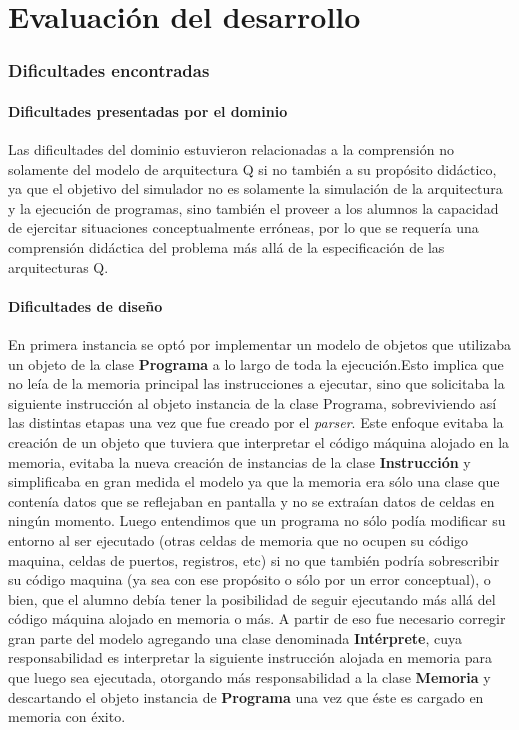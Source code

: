\part{Evaluación del desarrollo}

\section{Dificultades encontradas}

\subsection{Dificultades presentadas por el dominio}
Las dificultades del dominio estuvieron relacionadas a la comprensión no solamente del modelo de arquitectura Q si no también a su propósito didáctico, ya que el objetivo del simulador no es solamente la simulación de la arquitectura y la ejecución de programas, sino también el proveer a los alumnos la capacidad de ejercitar situaciones conceptualmente erróneas, por lo que se requería una comprensión didáctica del problema más allá de la especificación de las arquitecturas Q. 

\subsection{Dificultades de diseño}
En primera instancia se optó por implementar un modelo de objetos que utilizaba un objeto de la clase \textbf{Programa} a lo largo de toda la ejecución.Esto implica que no leía de la memoria principal las instrucciones a ejecutar, sino que solicitaba la siguiente instrucción al objeto instancia de la clase Programa, sobreviviendo así las distintas etapas una vez que fue creado por el \textit{parser}. Este enfoque evitaba la creación de un objeto que tuviera que interpretar el código máquina alojado en la memoria, evitaba la nueva creación de instancias de la clase \textbf{Instrucción} y simplificaba en gran medida el modelo ya que la memoria era sólo una clase que contenía datos que se reflejaban en pantalla y no se extraían datos de celdas en ningún momento. Luego entendimos que un programa no sólo podía modificar su entorno al ser ejecutado (otras celdas de memoria que no ocupen su código maquina, celdas de puertos, registros, etc) si no que también podría sobrescribir su código maquina (ya sea con ese propósito o sólo por un error conceptual), o bien, que el alumno debía tener la posibilidad de seguir ejecutando más allá del código máquina alojado en memoria o más. A partir de eso fue necesario corregir gran parte del modelo agregando una clase denominada \textbf{Intérprete}, cuya responsabilidad es interpretar la siguiente instrucción alojada en memoria para que luego sea ejecutada, otorgando más responsabilidad a la clase \textbf{Memoria} y descartando el objeto instancia de \textbf{Programa} una vez que éste es cargado en memoria con éxito.\\

